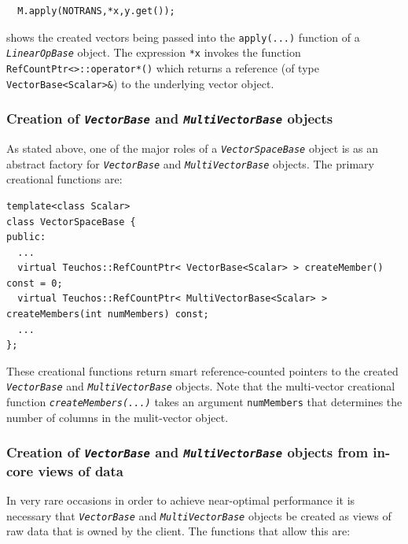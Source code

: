 \documentclass[pdf,ps2pdf,11pt]{SANDreport}
\begin{document}
{\scriptsize\begin{verbatim}
  M.apply(NOTRANS,*x,y.get());
\end{verbatim}}

{}\noindent{}shows the created vectors being passed into the
{}\texttt{apply(\-...)}  function of a {}\texttt{\textit{Linear\-Op\-Base}}
object.  The expression {}\texttt{*x} invokes the function
{}\texttt{RefCountPtr<>\-::operator*()} which returns a reference (of
type {}\texttt{VectorBase<Scalar>\&}) to the underlying vector object.

%
\subsubsection{Creation of {}\texttt{\textit{Vector\-Base}} and {}\texttt{\textit{Multi\-Vector\-Base}} objects}
\label{tsfcore:sec:vec_spc_create}
%

As stated above, one of the major roles of a
{}\texttt{\textit{Vector\-Space\-Base}} object is as an abstract factory for
{}\texttt{\textit{Vector\-Base}} and {}\texttt{\textit{Multi\-Vector\-Base}}
objects.  The primary creational functions are:

{\scriptsize\begin{verbatim}
template<class Scalar>
class VectorSpaceBase {
public:
  ...
  virtual Teuchos::RefCountPtr< VectorBase<Scalar> > createMember() const = 0;
  virtual Teuchos::RefCountPtr< MultiVectorBase<Scalar> > createMembers(int numMembers) const;
  ...
};
\end{verbatim}}

These creational functions return smart reference-counted pointers to
the created {}\texttt{\textit{Vector\-Base}} and
{}\texttt{\textit{Multi\-Vector\-Base}} objects.  Note that the multi-vector creational function
{}\texttt{\textit{create\-Members(...)}} takes an argument {}\texttt{num\-Members} that determines
the number of columns in the mulit-vector object.

%
\subsubsection{Creation of {}\texttt{\textit{Vector\-Base}} and {}\texttt{\textit{Multi\-Vector\-Base}} objects
from in-core views of data}
\label{tsfcore:sec:vec_spc_create_view}
%

In very rare occasions in order to achieve near-optimal performance it
is necessary that {}\texttt{\textit{Vector\-Base}} and
{}\texttt{\textit{Multi\-Vector\-Base}} objects be created as views of raw
data that is owned by the client.  The functions that allow this are:
\end{document}
